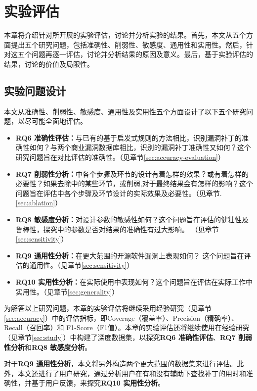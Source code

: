 \chapter{实验评估}

本章将介绍针对\tool 所开展的实验评估，讨论并分析实验的结果。首先，本文从五个方面提出五个研究问题，包括准确性、削弱性、敏感度、通用性和实用性。然后，针对这五个问题再逐一评估，讨论并分析结果的原因及意义。最后，基于实验评估的结果，讨论\tool 的价值及局限性。

\section{实验问题设计}
本文从准确性、削弱性、敏感度、通用性及实用性五个方面设计了以下五个研究问题，以尽可能全面地评估\tool 。

\begin{itemize}[leftmargin=*]
\item \textbf{RQ6 准确性评估：}与已有的基于启发式规则的方法相比，\tool 识别漏洞补丁的准确性如何？与两个商业漏洞数据库相比，\tool 识别的漏洞补丁准确性又如何？这个研究问题旨在对比评估\tool 的准确性。（见章节\ref{sec:accuracy-evaluation}）
\item \textbf{RQ7 削弱性分析：}\tool 中各个步骤及环节的设计有着怎样的效果？或有着怎样的必要性？如果去除\tool 中的某些环节，或削弱\tool ,对于最终结果会有怎样的影响？这个问题旨在评估\tool 中各个步骤及环节设计的实际效果及必要性。（见章节.\ref{sec:ablation}）
\item \textbf{RQ8 敏感度分析：}\tool 对设计参数的敏感性如何？这个问题旨在评估\tool 的健壮性及鲁棒性，探究\tool 中的参数是否对结果的准确性有过大影响。 （见章节\ref{sec:sensitivity}）
\item \textbf{RQ9 通用性分析：}\tool 在更大范围的开源软件漏洞上表现如何？ 这个问题旨在评估\tool 的通用性。（见章节\ref{sec:sensitivity}）
\item \textbf{RQ10 实用性分析：}\tool 在实际使用中表现如何？这个问题旨在评估\tool 在实际工作中实用性。（见章节\ref{sec:generality}）
\end{itemize}

为解答以上研究问题，本章的实验评估将继续采用经验研究（见章节\ref{sec:accuracy}）中的评估指标，即Coverage（覆盖率）、Precision（精确率）、Recall（召回率）和 F1-Score（F1值）。本章的实验评估还将继续使用在经验研究（见章节\ref{sec:study}）中构建了深度数据集，以探究\textbf{RQ6 准确性评估}、\textbf{RQ7 削弱性分析}和\textbf{RQ8 敏感度分析}。

对于\textbf{RQ9 通用性分析}，本文将另外构造两个更大范围的数据集来进行评估。此外，本文还进行了用户研究，通过分析用户在有和没有\tool 辅助下查找补丁的用时和准确性，并基于用户反馈，来探究\textbf{RQ10 实用性分析}。


